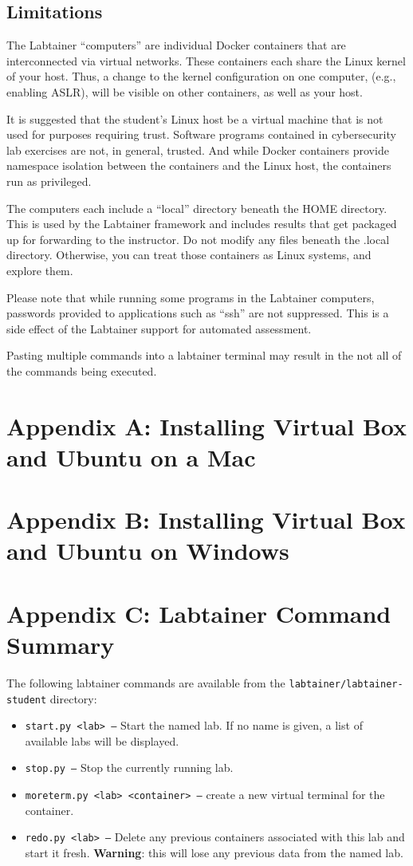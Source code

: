 \documentclass[12pt]{article}
\begin{document}
\subsection{Limitations}
The Labtainer ``computers'' are individual Docker containers that are interconnected via virtual
networks.  These containers each share the Linux kernel of your host.  Thus, a change
to the kernel configuration on one computer, (e.g., enabling ASLR), will be visible on
other containers, as well as your host.

It is suggested that the student's Linux host be a virtual machine that is
not used for purposes requiring trust.  Software programs contained in cybersecurity lab
exercises are not, in general, trusted.  And while Docker containers provide namespace
isolation between the containers and the Linux host, the containers run as privileged.

The computers each include a ``local'' directory beneath the HOME directory.  This is used
by the Labtainer framework and includes results that get packaged up for forwarding to the
instructor.  Do not modify any files beneath the .local directory.  Otherwise, you can treat
those containers as Linux systems, and explore them.

Please note that while running some programs in the Labtainer computers, passwords provided to
applications such as ``ssh'' are not suppressed.  This is a side effect of the Labtainer
support for automated assessment.  

Pasting multiple commands into a labtainer terminal may result in the not all of the
commands being executed.


\appendix 
\section {Appendix A: Installing Virtual Box and Ubuntu on a Mac}

\appendix 
\section {Appendix B: Installing Virtual Box and Ubuntu on Windows}

\appendix 
\section {Appendix C: Labtainer Command Summary}
\label{sec:appendixC}
The following labtainer commands are available from the \texttt{labtainer/labtainer-student}
directory:
\begin{itemize}
\item \texttt{start.py <lab> --}
Start the named lab.  If no name is given, a list of available labs will be displayed.
\item \texttt{stop.py  --} Stop the currently running lab.
\item \texttt{moreterm.py <lab> <container> --} create a new virtual terminal for the container.
\item \texttt{redo.py <lab> --}
Delete any previous containers associated with this lab and start it fresh.  \textbf{Warning}: this will lose any
previous data from the named lab.
\end{itemize}
\end{document}
